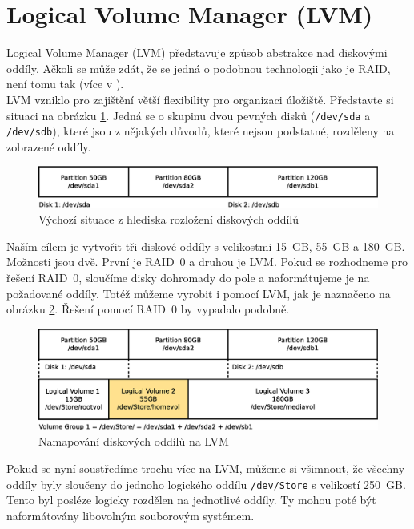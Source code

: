 \section{Logical Volume Manager (LVM)}
Logical Volume Manager (LVM) představuje způsob abstrakce nad diskovými oddíly. Ačkoli se může zdát, že se jedná o podobnou technologii jako je RAID, není tomu tak (více v \cite{arch-lvm}).\\
LVM vzniklo pro zajištění větší flexibility pro organizaci úložiště. Představte si situaci na obrázku \ref{fig:lvm1}. Jedná se o skupinu dvou pevných disků (\texttt{/dev/sda} a \texttt{/dev/sdb}), které jsou z nějakých důvodů, které nejsou podstatné, rozděleny na zobrazené oddíly.\\
\begin{figure}[] 
    \centering
    \includegraphics[scale=0.42]{obrazky/lvm1.eps}
    \caption{Výchozí situace z hlediska rozložení diskových oddílů}
    \label{fig:lvm1}
\end{figure}Naším cílem je vytvořit tři diskové oddíly s velikostmi 15~GB, 55~GB a 180~GB. Možnosti jsou dvě. První je RAID~0 a druhou je LVM. Pokud se rozhodneme pro řešení RAID~0, sloučíme disky dohromady do pole a naformátujeme je na požadované oddíly. Totéž můžeme vyrobit i pomocí LVM, jak je naznačeno na obrázku \ref{fig:lvm2}. Řešení pomocí RAID~0 by vypadalo podobně.\\
\begin{figure}[] 
    \centering
    \includegraphics[scale=0.42]{obrazky/lvm2.eps}
    \caption{Namapování diskových oddílů na LVM}
    \label{fig:lvm2}
\end{figure}Pokud se nyní soustředíme trochu více na LVM, můžeme si všimnout, že všechny oddíly byly sloučeny do jednoho logického oddílu \texttt{/dev/Store} s velikostí 250~GB. Tento byl posléze logicky rozdělen na jednotlivé oddíly. Ty mohou poté být naformátovány libovolným souborovým systémem.\\
